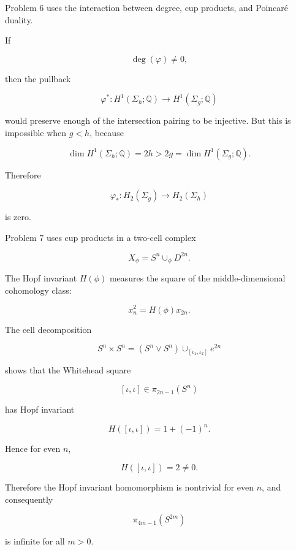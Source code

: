 \documentclass[12pt,a4paper]{article}
\theoremstyle{notespace}
\begin{document}
Problem 6 uses the interaction between degree, cup products, and Poincaré duality.

If

\[
\deg(\varphi)\neq 0,
\]

then the pullback

\[
\varphi^*:H^1(\Sigma_h;\mathbb Q)\to H^1(\Sigma_g;\mathbb Q)
\]

would preserve enough of the intersection pairing to be injective. But this is impossible when \(g<h\), because

\[
\dim H^1(\Sigma_h;\mathbb Q)=2h>2g=\dim H^1(\Sigma_g;\mathbb Q).
\]

Therefore

\[
\varphi_*:H_2(\Sigma_g)\to H_2(\Sigma_h)
\]

is zero.

Problem 7 uses cup products in a two-cell complex

\[
X_\phi=S^n\cup_\phi D^{2n}.
\]

The Hopf invariant \(H(\phi)\) measures the square of the middle-dimensional cohomology class:

\[
x_n^2=H(\phi)x_{2n}.
\]

The cell decomposition

\[
S^n\times S^n=(S^n\vee S^n)\cup_{[\iota_1,\iota_2]}e^{2n}
\]

shows that the Whitehead square

\[
[\iota,\iota]\in \pi_{2n-1}(S^n)
\]

has Hopf invariant

\[
H([\iota,\iota])=1+(-1)^n.
\]

Hence for even \(n\),

\[
H([\iota,\iota])=2\neq 0.
\]

Therefore the Hopf invariant homomorphism is nontrivial for even \(n\), and consequently

\[
\pi_{4m-1}(S^{2m})
\]

is infinite for all \(m>0\).
\end{document}
